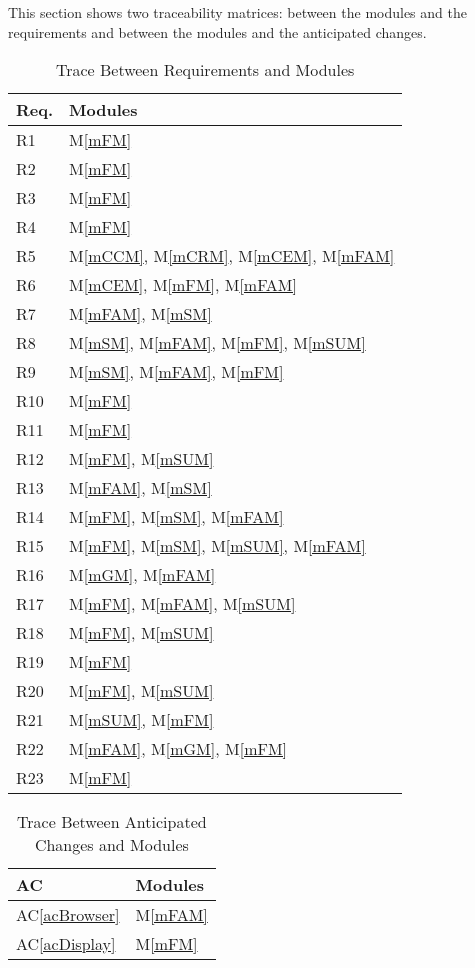 \documentclass[12pt, titlepage]{article}
\newcommand{\acref}[1]{AC\ref{#1}}
\newcommand{\mref}[1]{M\ref{#1}}
\begin{document}
This section shows two traceability matrices: between the modules and the
requirements and between the modules and the anticipated changes.

\begin{table}[H]
\centering
\begin{tabular}{p{} p{}}
\toprule
\textbf{Req.} & \textbf{Modules}\\
\midrule
R1 & \mref{mFM}\\
R2 & \mref{mFM}\\
R3 & \mref{mFM}\\
R4 & \mref{mFM}\\
R5 & \mref{mCCM}, \mref{mCRM}, \mref{mCEM}, \mref{mFAM}\\
R6 & \mref{mCEM}, \mref{mFM}, \mref{mFAM}\\
R7 & \mref{mFAM}, \mref{mSM}\\
R8 & \mref{mSM}, \mref{mFAM}, \mref{mFM}, \mref{mSUM}\\
R9 & \mref{mSM}, \mref{mFAM}, \mref{mFM}\\
R10 & \mref{mFM}\\
R11 & \mref{mFM}\\
R12 & \mref{mFM}, \mref{mSUM}\\
R13 & \mref{mFAM}, \mref{mSM}\\
R14 & \mref{mFM}, \mref{mSM}, \mref{mFAM}\\
R15 & \mref{mFM}, \mref{mSM}, \mref{mSUM}, \mref{mFAM}\\
R16 & \mref{mGM}, \mref{mFAM}\\
R17 & \mref{mFM}, \mref{mFAM}, \mref{mSUM}\\
R18 & \mref{mFM}, \mref{mSUM}\\
R19 & \mref{mFM}\\
R20 & \mref{mFM}, \mref{mSUM}\\
R21 & \mref{mSUM}, \mref{mFM}\\
R22 & \mref{mFAM}, \mref{mGM}, \mref{mFM}\\
R23 & \mref{mFM} \\
\bottomrule
\end{tabular}
\caption{Trace Between Requirements and Modules}
\label{TblRT}
\end{table}

\begin{table}[H]
\centering
\begin{tabular}{p{} p{}}
\toprule
\textbf{AC} & \textbf{Modules}\\
\midrule
\acref{acBrowser} & \mref{mFAM}\\
\acref{acDisplay} & \mref{mFM}\\
\bottomrule
\end{tabular}
\caption{Trace Between Anticipated Changes and Modules}
\label{TblACT}
\end{table}
\end{document}
